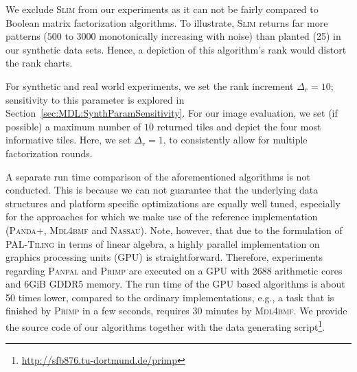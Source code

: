 We exclude \textsc{Slim} from our experiments as it can not be fairly compared to Boolean matrix factorization algorithms. To illustrate, \textsc{Slim} returns far more patterns ($500$ to $3000$ monotonically increasing with noise) than planted (25) in our synthetic data sets. Hence, a depiction of this algorithm's rank would distort the rank charts.

For synthetic and real world experiments, we set the rank increment $\Delta_r=10$; sensitivity to this parameter is explored in Section~\ref{sec:MDL:SynthParamSensitivity}. For our image evaluation, we set (if possible) a maximum number of $10$ returned tiles and depict the four most informative tiles. Here, we set $\Delta_r=1$, to consistently allow for multiple factorization rounds. 

A separate run time comparison of the aforementioned algorithms is not conducted. This is because we can not guarantee that the underlying data structures and platform specific optimizations are equally well tuned, especially for the approaches for which we make use of the reference implementation (\textsc{Panda+}, \textsc{Mdl4bmf} and \textsc{Nassau}). Note, however, that due to the formulation of \textsc{PAL-Tiling} in terms of linear algebra, a highly parallel implementation on graphics processing units (GPU) is straightforward. Therefore, experiments regarding \textsc{Panpal} and \textsc{Primp} are executed on a GPU with 2688 arithmetic cores and 6GiB GDDR5 memory. The run time of the GPU based algorithms is about 50 times lower, compared to the ordinary implementations, e.g., a task that is finished by \textsc{Primp} in a few seconds, requires 30 minutes by \textsc{Mdl4bmf}. We provide the source code of our algorithms together with the data generating script\footnote{\url{http://sfb876.tu-dortmund.de/primp}}.

